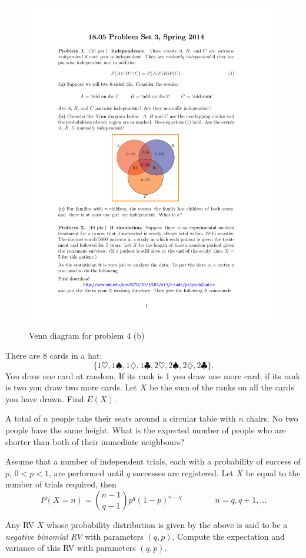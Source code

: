 \documentclass[a4paper,10pt,landscape,twocolumn]{scrartcl}
\begin{document}
\begin{figure}\centering
	\includegraphics[width=.2\textwidth]{media/03-venn}	
	\caption{Venn diagram for problem 4 (b)\label{fig:venn}}
\end{figure}



\begin{exercise}
There are $8$ cards in a hat:
	\[
		\{1\heartsuit, 1\spadesuit, 1\diamondsuit, 1\clubsuit, 2\heartsuit, 2\spadesuit, 2\diamondsuit, 2\clubsuit\}.
	\]
You draw one card at random. If its rank is 1 you draw one more card;
if its rank is two you draw two more cards. Let $X$ be the sum of the
ranks on all the cards you have drawn. Find $E(X)$.
	
\end{exercise}

\begin{exercise}
	A total of $n$ people take their seats around a circular table with $n$ chairs. No two people have the same height. What is the expected number of people who are shorter than both of their immediate neighbours?
\end{exercise}


%	


\begin{exercise}
 Assume that a number of independent trials, each with a probability of success of $p$, $0 < p < 1$, are performed until $q$ successes are registered. Let $X$ be equal to the number of trials required, then
	$$P(X = n) = {{n-1} \choose {q-1}} p^{q} (1 - p)^{n-q} \qquad \qquad n = q, q+1, ...$$

	Any RV $X$ whose probability distribution is given by the above is said to be a {\em negative binomial RV} with parameters $(q,p)$. Compute the expectation and variance of this RV with parameters $(q,p)$.	
\end{exercise}
\end{document}
